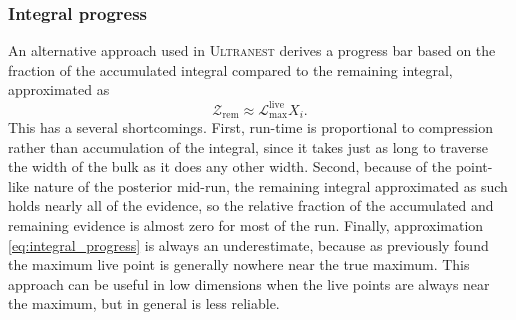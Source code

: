 \documentclass[usenatbib]{mnras}
\newcommand{\Like}{\mathcal{L}}
\begin{document}
\subsubsection{Integral progress}
An alternative approach used in \textsc{Ultranest} \citep{ultranest} derives a progress bar based on the fraction of the accumulated integral compared to the remaining integral, approximated as 
\begin{equation}\label{eq:integral_progress}
    \mathcal{Z}_\mathrm{rem} \approx \Like_\mathrm{max}^{\mathrm{live}} X_i.
\end{equation}
This has a several shortcomings. First, run-time is proportional to compression rather than accumulation of the integral, since it takes just as long to traverse the width of the bulk as it does any other width. Second, because of the point-like nature of the posterior mid-run, the remaining integral approximated as such holds nearly all of the evidence, so the relative fraction of the accumulated and remaining evidence is almost zero for most of the run. Finally, approximation \cref{eq:integral_progress} is always an underestimate, because as previously found the maximum live point is generally nowhere near the true maximum. This approach can be useful in low dimensions when the live points are always near the maximum, but in general is less reliable.
\end{document}
